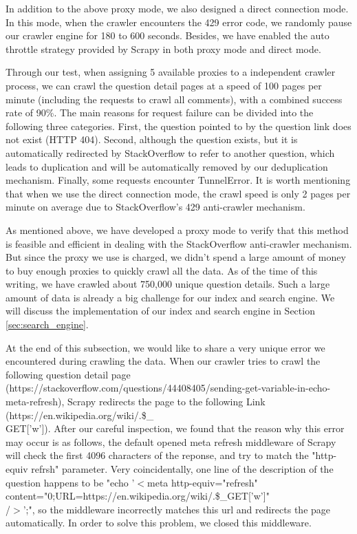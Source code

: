\documentclass[10pt,journal,compsoc]{IEEEtran}
\begin{document}
In addition to the above proxy mode, we also designed a direct connection mode. In this mode, when the crawler encounters the 429 error code, we randomly pause our crawler engine for 180 to 600 seconds. Besides, we have enabled the auto throttle strategy provided by Scrapy in both proxy mode and direct mode.

Through our test, when assigning 5 available proxies to a independent crawler process, we can crawl the question detail pages at a speed of 100 pages per minute (including the requests to crawl all comments), with a combined success rate of 90\%. The main reasons for request failure can be divided into the following three categories. First, the question pointed to by the question link does not exist (HTTP 404). Second, although the question exists, but it is automatically redirected by StackOverflow to refer to another question, which leads to duplication and will be automatically removed by our deduplication mechanism. Finally, some requests encounter TunnelError. It is worth mentioning that when we use the direct connection mode, the crawl speed is only 2 pages per minute on average due to StackOverflow's 429 anti-crawler mechanism.

As mentioned above, we have developed a proxy mode to verify that this method is feasible and efficient in dealing with the StackOverflow anti-crawler mechanism. But since the proxy we use is charged, we didn't spend a large amount of money to buy enough proxies to quickly crawl all the data. As of the time of this writing, we have crawled about 750,000 unique question details. Such a large amount of data is already a big challenge for our index and search engine. We will discuss the implementation of our index and search engine in Section \ref{sec:search_engine}.

At the end of this subsection, we would like to share a very unique error we encountered during crawling the data. When our crawler tries to crawl the following question detail page (https://stackoverflow.com/questions/44408405/sending-get-variable-in-echo-meta-refresh), Scrapy redirects the page to the following Link (https://en.wikipedia.org/wiki/.\$\_\\GET['w']). After our careful inspection, we found that the reason why this error may occur is as follows, the default opened meta refresh middleware of Scrapy will check the first 4096 characters of the reponse, and try to match the "http-equiv refrsh" parameter. Very coincidentally, one line of the description of the question happens to be "echo '$<$meta http-equiv="refresh" content="0;URL=https://en.wikipedia.org/wiki/.\$\_GET['w']"\\/$>$';", so the middleware incorrectly matches this url and redirects the page automatically. In order to solve this problem, we closed this middleware.
\end{document}
